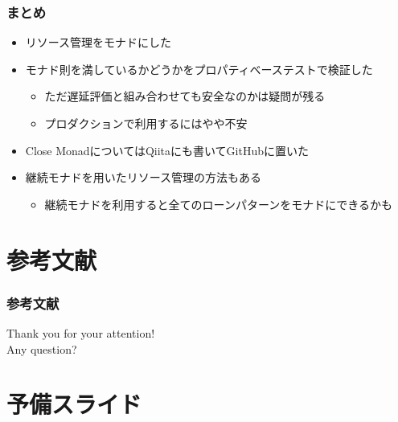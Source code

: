 \begin{frame}
  \frametitle{まとめ}

  \begin{itemize}
    \item<2-> リソース管理をモナドにした
    \item<3-> モナド則を満しているかどうかをプロパティベーステストで検証した
    \begin{itemize}
      \item<4-> ただ遅延評価と組み合わせても安全なのかは疑問が残る
      \item<5-> プロダクションで利用するにはやや不安
    \end{itemize}
    \item<6-> Close MonadについてはQiitaにも書いてGitHubに置いた\cite{closemonad,closemonadgithub}
    \item<7-> 継続モナドを用いたリソース管理の方法もある\cite{tanakh2015,jwhaco2017}
    \begin{itemize}
      \item 継続モナドを利用すると全てのローンパターンをモナドにできるかも
    \end{itemize}
  \end{itemize}
\end{frame}

\section*{参考文献}

\begin{frame}[allowframebreaks]
  \frametitle{参考文献}

  
  \nocite{*}

  
\end{frame}

\begin{frame}
  \centering
  {\Huge Thank you for your attention!\\
    \vspace{1em}
    Any question?
  }
\end{frame}



\section*{予備スライド}

